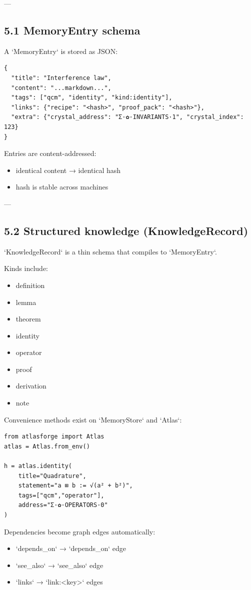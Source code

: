 \documentclass[11pt]{article}
\begin{document}
---

\subsection{5.1 MemoryEntry schema}

A `MemoryEntry` is stored as JSON:

\begin{lstlisting}
{
  "title": "Interference law",
  "content": "...markdown...",
  "tags": ["qcm", "identity", "kind:identity"],
  "links": {"recipe": "<hash>", "proof_pack": "<hash>"},
  "extra": {"crystal_address": "Σ·✿·INVARIANTS·1", "crystal_index": 123}
}
\end{lstlisting}

Entries are content-addressed:
\begin{itemize}
\item identical content → identical hash
\item hash is stable across machines
\end{itemize}

---

\subsection{5.2 Structured knowledge (KnowledgeRecord)}

`KnowledgeRecord` is a thin schema that compiles to `MemoryEntry`.

Kinds include:
\begin{itemize}
\item definition
\item lemma
\item theorem
\item identity
\item operator
\item proof
\item derivation
\item note
\end{itemize}

Convenience methods exist on `MemoryStore` and `Atlas`:

\begin{lstlisting}
from atlasforge import Atlas
atlas = Atlas.from_env()

h = atlas.identity(
    title="Quadrature",
    statement="a ⊞ b := √(a² + b²)",
    tags=["qcm","operator"],
    address="Σ·✿·OPERATORS·0"
)
\end{lstlisting}

Dependencies become graph edges automatically:
\begin{itemize}
\item `depends\_on` → `depends\_on` edge
\item `see\_also` → `see\_also` edge
\item `links` → `link:<key>` edges
\end{itemize}
\end{document}
